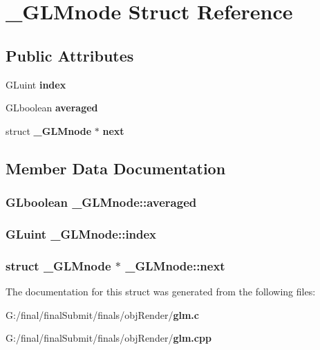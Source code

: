 \section{\-\_\-\-G\-L\-Mnode Struct Reference}
\label{struct___g_l_mnode}
\subsection*{Public Attributes}
\begin{DoxyCompactItemize}
\item 
G\-Luint {\bf index}
\item 
G\-Lboolean {\bf averaged}
\item 
struct {\bf \-\_\-\-G\-L\-Mnode} $\ast$ {\bf next}
\end{DoxyCompactItemize}


\subsection{Member Data Documentation}
\subsubsection[{averaged}]{\setlength{\rightskip}{0pt plus 5cm}G\-Lboolean \-\_\-\-G\-L\-Mnode\-::averaged}\label{struct___g_l_mnode_a24056262ae27d98869a9ddb9aee71f26}
\subsubsection[{index}]{\setlength{\rightskip}{0pt plus 5cm}G\-Luint \-\_\-\-G\-L\-Mnode\-::index}\label{struct___g_l_mnode_a623dff51dc67366e5fa2e3b27a12eb5a}
\subsubsection[{next}]{\setlength{\rightskip}{0pt plus 5cm}struct {\bf \-\_\-\-G\-L\-Mnode} $\ast$ \-\_\-\-G\-L\-Mnode\-::next}\label{struct___g_l_mnode_a46b11f161b95154ff391671b2e8869c8}


The documentation for this struct was generated from the following files\-:\begin{DoxyCompactItemize}
\item 
G\-:/final/final\-Submit/finals/obj\-Render/{\bf glm.\-c}\item 
G\-:/final/final\-Submit/finals/obj\-Render/{\bf glm.\-cpp}\end{DoxyCompactItemize}
